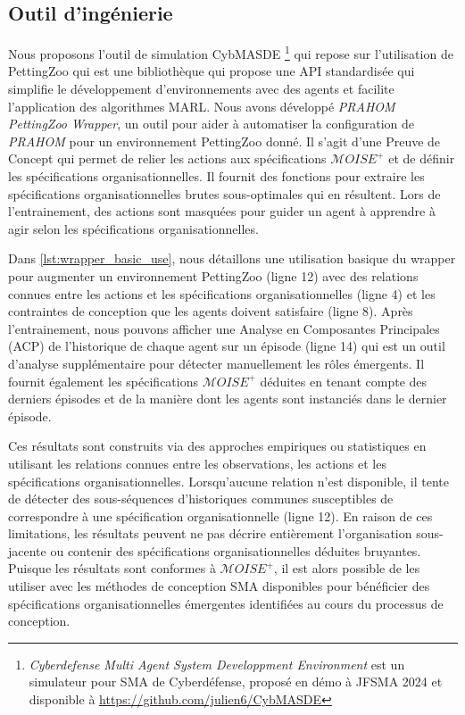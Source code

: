 \documentclass[contribution]{jfsma}
\newcounter{relation}
\begin{document}
\subsection{Outil d'ingénierie}

Nous proposons l'outil de simulation CybMASDE \footnote{\emph{Cyberdefense Multi Agent System Developpment Environment} est un simulateur pour SMA de Cyberdéfense, proposé en démo à JFSMA 2024 et disponible à \url{https://github.com/julien6/CybMASDE}} qui repose sur l'utilisation de PettingZoo qui est une bibliothèque qui propose une API standardisée qui simplifie le développement d'environnements avec des agents et facilite l'application des algorithmes MARL.
Nous avons développé \emph{PRAHOM PettingZoo Wrapper}\label{PettingZoo-wrapper}, un outil pour aider à automatiser la configuration de \emph{PRAHOM} pour un environnement PettingZoo donné.
Il s'agit d'une Preuve de Concept qui permet de relier les actions aux spécifications $\mathcal{M}OISE^+$ et de définir les spécifications organisationnelles. Il fournit des fonctions pour extraire les spécifications organisationnelles brutes sous-optimales qui en résultent. Lors de l'entrainement, des actions sont masquées pour guider un agent à apprendre à agir selon les spécifications organisationnelles.

Dans \autoref{lst:wrapper_basic_use}, nous détaillons une utilisation basique du wrapper pour augmenter un environnement PettingZoo (ligne 12) avec des relations connues entre les actions et les spécifications organisationnelles (ligne 4) et les contraintes de conception que les agents doivent satisfaire (ligne 8). Après l'entrainement, nous pouvons afficher une Analyse en Composantes Principales (ACP) de l'historique de chaque agent sur un épisode (ligne 14) qui est un outil d'analyse supplémentaire pour détecter manuellement les rôles émergents. Il fournit également les spécifications $\mathcal{M}OISE^+$ déduites en tenant compte des derniers épisodes et de la manière dont les agents sont instanciés dans le dernier épisode.

Ces résultats sont construits via des approches empiriques ou statistiques en utilisant les relations connues entre les observations, les actions et les spécifications organisationnelles. Lorsqu'aucune relation n'est disponible, il tente de détecter des sous-séquences d'historiques communes susceptibles de correspondre à une spécification organisationnelle (ligne 12). En raison de ces limitations, les résultats peuvent ne pas décrire entièrement l’organisation sous-jacente ou contenir des spécifications organisationnelles déduites bruyantes. Puisque les résultats sont conformes à $\mathcal{M}OISE^+$, il est alors possible de les utiliser avec les méthodes de conception SMA disponibles pour bénéficier des spécifications organisationnelles émergentes identifiées au cours du processus de conception.
\end{document}

